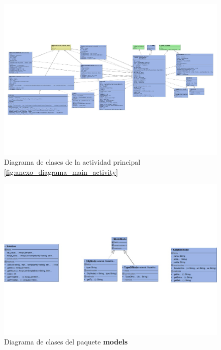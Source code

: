 \begin{figure}[H]
	\centering
	\includegraphics[scale=.8,angle=90]{imagenes/main_activity_class_diagram.pdf}
	\caption{Diagrama de clases de la actividad principal \ref{fig:anexo_diagrama_main_activity} }
	\label{fig:main_activity_diagram}
\end{figure}
\begin{figure}[H]
	\centering
	\includegraphics[scale=0.8,angle=90]{imagenes/models_package.pdf}
	\caption{Diagrama de clases del paquete \textbf{models}}
	\label{fig:models_diagram}
\end{figure}

